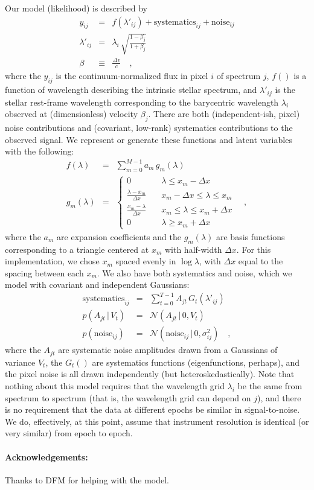 \documentclass[12pt, letterpaper]{article}
\newcommand{\given}{\,|\,}
\newcommand{\normal}{{\mathcal{N}}}
\begin{document}
Our model (likelihood) is described by
\begin{eqnarray}
  y_{ij} &=& f(\lambda'_{ij}) + \mathrm{systematics}_{ij} + \mathrm{noise}_{ij}
  \\
  \lambda'_{ij} &=& \lambda_i\,\sqrt{\frac{1 - \beta_j}{1 + \beta_j}}
  \\
  \beta &\equiv& \frac{\Delta v}{c}
  \quad , 
\end{eqnarray}
where the $y_{ij}$ is the continuum-normalized flux in pixel $i$ of
spectrum $j$, $f()$ is a function of
wavelength describing the intrinsic stellar spectrum, and
$\lambda'_{ij}$ is the stellar rest-frame wavelength
corresponding to the barycentric wavelength $\lambda_i$ observed at
(dimensionless) velocity $\beta_j$.
There are both (independent-ish, pixel) noise contributions and
(covariant, low-rank) systematics contributions to the observed
signal.
We represent or generate these functions and latent variables
with the following:
\begin{eqnarray}
  f(\lambda) &=& \sum_{m=0}^{M-1} a_m\,g_m(\lambda)
  \\
  g_m(\lambda) &=& \left\{
        \begin{array}{ll}
            0 & \quad \lambda \leq x_m -\Delta x \\
            \frac{\lambda - x_m}{\Delta x} & \quad x_m - \Delta x \leq \lambda \leq x_m \\
            \frac{x_m - \lambda}{\Delta x} & \quad x_m \leq \lambda \leq x_m + \Delta x \\
            0 & \quad \lambda \geq x_m + \Delta x
        \end{array}
    \right.
  \quad ,
\end{eqnarray}
where the $a_m$ are expansion coefficients and the $g_m(\lambda)$
are basis functions corresponding to a triangle centered at $x_m$ with half-width 
$\Delta x$. For this implementation, we chose $x_m$ spaced evenly in $\log \lambda$, 
with $\Delta x$ equal to the spacing between each $x_m$.
We also have both systematics and noise, which we model with covariant
and independent Gaussians:
\begin{eqnarray}
  \mathrm{systematics}_{ij} &=& \sum_{t=0}^{T-1} A_{jt}\,G_t(\lambda'_{ij})
  \\
  p(A_{jt}\given V_t) &=& \normal(A_{jt}\given 0,V_t)
  \\
  p(\mathrm{noise}_{ij}) &=& \normal(\mathrm{noise}_{ij}\given 0,\sigma_{ij}^2)
  \quad ,
\end{eqnarray}
where the $A_{jt}$ are systematic noise amplitudes drawn from a
Gaussians of variance $V_t$, the $G_{t}()$ are systematics functions
(eigenfunctions, perhaps), and the pixel noise is all drawn
independently (but heteroskedastically).
Note that nothing about this model requires that the wavelength grid
$\lambda_i$ be the same from spectrum to spectrum (that is, the
wavelength grid can depend on $j$), and there is no requirement that
the data at different epochs be similar in signal-to-noise. We do,
effectively, at this point, assume that instrument resolution is
identical (or very similar) from epoch to epoch.


\paragraph{Acknowledgements:}
Thanks to DFM for helping with the model.
\end{document}
